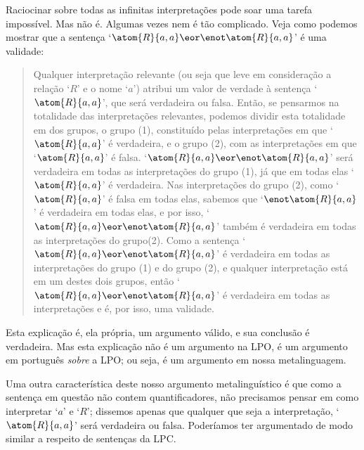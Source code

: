 Raciocinar sobre todas as infinitas interpretações pode soar uma tarefa impossível.
Mas não é.
Algumas vezes nem  é tão complicado.
Veja como podemos mostrar que a sentença \mbox{`$\atom{R}{a,a}\eor\enot \atom{R}{a,a}$'} é uma validade:
	\begin{quote}
		\label{allmodels1}
		Qualquer interpretação relevante (ou seja que leve em consideração a relação `$R$' e o nome `$a$') atribui um valor de verdade à sentença `$\atom{R}{a,a}$', que será verdadeira ou falsa.
		Então, se pensarmos na totalidade das interpretações relevantes, podemos dividir esta totalidade em dos grupos, o grupo (1), constituído pelas interpretações em que `$\atom{R}{a,a}$' é verdadeira, e o grupo (2), com as interpretações em que  `$\atom{R}{a,a}$' é falsa.
		`$\atom{R}{a,a}\eor\enot \atom{R}{a,a}$' será verdadeira em todas as interpretações do grupo (1), já que em todas elas `$\atom{R}{a,a}$' é verdadeira.
		Nas interpretações do grupo (2), como  `$\atom{R}{a,a}$' é falsa em todas elas, sabemos que `$\enot \atom{R}{a,a}$' é verdadeira em todas elas, e por isso, `$\atom{R}{a,a}\eor\enot \atom{R}{a,a}$' também é verdadeira em todas as interpretações do grupo(2).
		Como a sentença `$\atom{R}{a,a}\eor\enot \atom{R}{a,a}$' é verdadeira em todas as interpretações do grupo (1) e do grupo (2), e qualquer interpretação está em um destes dois grupos, então `$\atom{R}{a,a}\eor\enot \atom{R}{a,a}$' é verdadeira em todas as interpretações e é, por isso, uma validade.
	\end{quote}
Esta explicação é, ela própria, um argumento válido, e sua conclusão é verdadeira. Mas esta explicação não é um argumento na LPO, é um argumento em português \emph{sobre} a LPO; ou seja, é um argumento em nossa metalinguagem.

Uma outra característica deste nosso argumento metalinguístico é que como a sentença em questão não contem quantificadores, não precisamos pensar em como interpretar `$a$' e `$R$'; dissemos apenas que qualquer que seja a interpretação,  `$\atom{R}{a,a}$' será verdadeira ou falsa.
Poderíamos ter argumentado de modo similar a respeito de sentenças da LPC.

